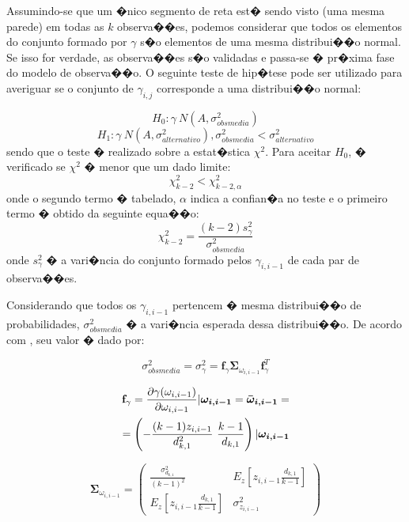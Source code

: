 Assumindo-se que um �nico segmento de reta est� sendo visto (uma mesma parede) em todas as $k$ observa��es, podemos considerar que todos os elementos do conjunto formado por $\gamma$ s�o elementos de uma mesma distribui��o normal. Se isso for verdade, as observa��es s�o validadas e passa-se � pr�xima fase do modelo de observa��o. O seguinte teste de hip�tese pode ser utilizado para averiguar se o conjunto de $\gamma_{i,j}$ corresponde a uma distribui��o normal:

\begin{equation*}
		H_{0}:\gamma ~ N(A, \sigma^{2}_{obsmedia})
\end{equation*}
\begin{equation*}
		H_{1}:\gamma ~ N(A, \sigma^{2}_{alternativo}), \sigma^{2}_{obsmedia} < \sigma^{2}_{alternativo}
\end{equation*}
sendo que o teste � realizado sobre a estat�stica $\chi^{2}$.
Para aceitar $H_{0}$, � verificado se $\chi^{2}$ � menor que um dado limite:
\begin{equation}
	\chi^{2}_{k-2} < \chi^{2}_{k-2,\alpha}
	\label{eq:chitest}
\end{equation}
onde o segundo termo � tabelado, $\alpha$ indica a confian�a no teste e o primeiro termo � obtido da seguinte equa��o:
\begin{equation*}
	\chi^{2}_{k-2} = \frac{(k-2)s^{2}_{\gamma}}{\sigma^{2}_{obsmedia}}
\end{equation*}
onde $s^{2}_{\gamma}$ � a vari�ncia do conjunto formado pelos $\gamma_{i,i-1}$ de cada par de observa��es.

Considerando que todos os $\gamma_{i,i-1}$ pertencem � mesma distribui��o de probabilidades, $\sigma^{2}_{obsmedia}$ � a vari�ncia esperada dessa distribui��o. De acordo com \cite{barra}, seu valor � dado por:

\begin{equation}
\sigma^2_{obsmedia}=\sigma^2_{\gamma} = \textbf{f}_\gamma \bm{\Sigma}_{\omega_{i,i-1}} \textbf{f}_\gamma^{T} 
\end{equation}

\begin{align}
\textbf{f}_\gamma=\frac{\partial\gamma(\omega_{i,i-1})}{\partial\omega_{i,i-1}}  |  \bm{\omega_{i,i-1}} = \bm{\bar{\omega}_{i,i-1}} = \notag \\
= \left( -\frac{(k-1)z_{i,i-1}}{d^{2}_{k,1}}~\frac{k-1}{d_{k,1}} \right) | \bm{\omega_{i,i-1}}
\end{align}

\begin{equation}
\bm{\Sigma}_{\omega_{i,i-1}} =
\begin{pmatrix}
\frac{\sigma^2_{d_{k,1}}}{(k-1)^2} & E_z\left[ z_{i, i-1} \frac{d_{k,1}}{k-1} \right] \\
 E_z\left[ z_{i, i-1} \frac{d_{k,1}}{k-1}\right] & \sigma^2_{z_{i,i-1}}
\end{pmatrix}
\end{equation}

